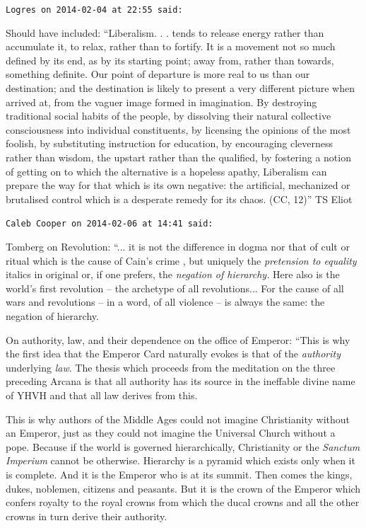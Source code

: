 \begin{footnotesize}
\begin{sffamily}
\texttt{Logres on 2014-02-04 at 22:55 said:}

Should have included: ``Liberalism. . . tends to release energy rather than accumulate it, to relax, rather than to fortify. It is a movement not so much defined by its end, as by its starting point; away from, rather than towards, something definite. Our point of departure is more real to us than our destination; and the destination is likely to present a very different picture when arrived at, from the vaguer image formed in imagination. By destroying traditional social habits of the people, by dissolving their natural collective consciousness into individual constituents, by licensing the opinions of the most foolish, by substituting instruction for education, by encouraging cleverness rather than wisdom, the upstart rather than the qualified, by fostering a notion of getting on to which the alternative is a hopeless apathy, Liberalism can prepare the way for that which is its own negative: the artificial, mechanized or brutalised control which is a desperate remedy for its chaos. (CC, 12)'' TS Eliot

\hfill

\texttt{Caleb Cooper on 2014-02-06 at 14:41 said:}

Tomberg on Revolution: ``... it is not the difference in dogma nor that of cult or ritual which is the cause of Cain's crime , but uniquely the \emph{pretension to equality} italics in original or, if one prefers, the \emph{negation of hierarchy.} Here also is the world's first revolution -- the archetype of all revolutions... For the cause of all wars and revolutions -- in a word, of all violence -- is always the same: the negation of hierarchy.

On authority, law, and their dependence on the office of Emperor: ``This is why the first idea that the Emperor Card naturally evokes is that of the \emph{authority} underlying \emph{law}. The thesis which proceeds from the meditation on the three preceding Arcana is that all authority has its source in the ineffable divine name of YHVH and that all law derives from this.

This is why authors of the Middle Ages could not imagine Christianity without an Emperor, just as they could not imagine the Universal Church without a pope. Because if the world is governed hierarchically, Christianity or the \emph{Sanctum Imperium} cannot be otherwise. Hierarchy is a pyramid which exists only when it is complete. And it is the Emperor who is at its summit. Then comes the kings, dukes, noblemen, citizens and peasants. But it is the crown of the Emperor which confers royalty to the royal crowns from which the ducal crowns and all the other crowns in turn derive their authority.


\end{sffamily}
\end{footnotesize}
